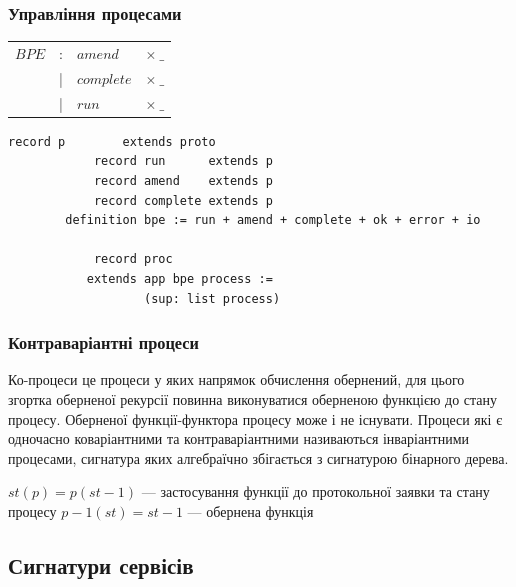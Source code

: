 \documentclass[11pt,oneside]{article}
\begin{document}
   \subsubsection{Управління процесами}

\begin{center}
\begin{tabular}{llll}
 $BPE$      &:& $amend$       & $\times\ \_$      \\
            &|& $complete$    & $\times\ \_$         \\
            &|& $run$         & $\times\ \_$          \\
\end{tabular}
\end{center}

\begin{center}
\begin{lstlisting}[mathescape=true]
            record p        extends proto
            record run      extends p
            record amend    extends p
            record complete extends p
        definition bpe := run + amend + complete + ok + error + io

            record proc
           extends app bpe process :=
                   (sup: list process)

\end{lstlisting}
\end{center}

  \subsubsection{Контраваріантні процеси}

  Ко-процеси це процеси у яких напрямок обчислення обернений, для цього
  згортка оберненої рекурсії повинна виконуватися оберненою функцією до стану процесу.
  Оберненої функції-функтора процесу може і не існувати. Процеси які є
  одночасно коваріантними та контраваріантними називаються інваріантними процесами, сигнатура яких
  алгебраїчно збігається з сигнатурою бінарного дерева.

\begin{center}
$st(p) = p(st-1)$ — застосування функції до протокольної заявки та стану процесу
$p-1(st) = st-1$ — обернена функція
\end{center}

\newpage


\subsection{Сигнатури сервісів}
\end{document}
